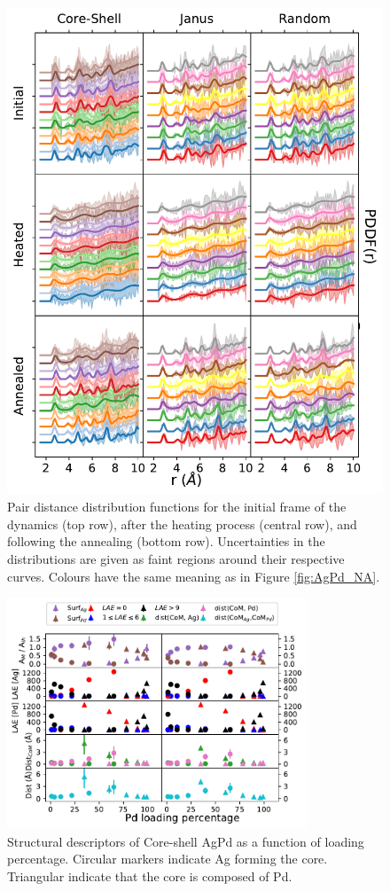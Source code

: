 \begin{figure}
    \centering
    \includegraphics{figures/MD/Alloys/Melt_Ag-Pd.pdf}
    \caption{Pair distance distribution functions for the initial frame of the dynamics (top row), after the heating process (central row), and following the annealing (bottom row). Uncertainties in the distributions are given as faint regions around their respective curves. Colours have the same meaning as in Figure \ref{fig:AgPd_NA}. }
    \label{fig:AgPd_PDF}
\end{figure}


\begin{figure}
    \centering
    \includegraphics[width=0.8\textwidth]{figures/MD/Alloys/Core-Shell_Ag-Pd.pdf}
    \caption{Structural descriptors of Core-shell AgPd as a function of loading percentage. Circular markers indicate Ag forming the core. Triangular indicate that the core is composed of Pd.}
    \label{fig:AgPdCS_Dyn}
\end{figure}

